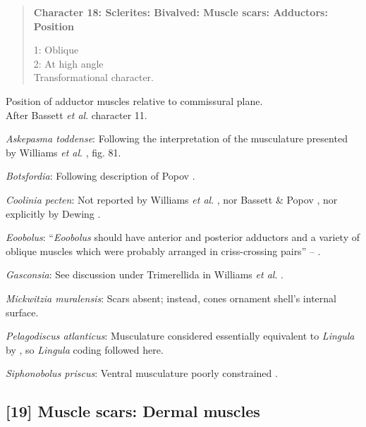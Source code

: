\documentclass[openany]{book}
\theoremstyle{definition}
\theoremstyle{definition}
\theoremstyle{definition}
\theoremstyle{remark}
\begin{document}
\begin{quote}
\textbf{Character 18: Sclerites: Bivalved: Muscle scars: Adductors:
Position}

1: Oblique\\
2: At high angle\\
Transformational character.
\end{quote}

Position of adductor muscles relative to commissural plane.\\
After Bassett \emph{et al}.
\citeyearpar{Bassett2001Functionalmorphology} character 11.

\hypertarget{Askepasma_toddense-coding-18}{}
\emph{Askepasma toddense}: Following the interpretation of the
musculature presented by Williams \emph{et al}.
\citeyearpar{Williams2000LinguliformeaCraniiformea}, fig. 81.

\hypertarget{Botsfordia-coding-18}{}
\emph{Botsfordia}: Following description of Popov
\citeyearpar{Popov1992TheCambrian}.

\hypertarget{Coolinia_pecten-coding-18}{}
\emph{Coolinia pecten}: Not reported by Williams \emph{et al}.
\citeyearpar{Williams2000LinguliformeaCraniiformea}, nor Bassett \&
Popov \citeyearpar{Bassett2017Earliestontogeny}, nor explicitly by
Dewing \citeyearpar{Dewing2001Hingemodifications}.

\hypertarget{Eoobolus-coding-18}{}
\emph{Eoobolus}: ``\emph{Eoobolus} should have anterior and posterior
adductors and a variety of oblique muscles which were probably arranged
in criss-crossing pairs'' -- \citet{Balthasar2009Thebrachiopod}.

\hypertarget{Gasconsia-coding-18}{}
\emph{Gasconsia}: See discussion under Trimerellida in Williams \emph{et
al}. \citeyearpar{Williams2000LinguliformeaCraniiformea}.

\hypertarget{Mickwitzia_muralensis-coding-18}{}
\emph{Mickwitzia muralensis}: Scars absent; instead, cones ornament
shell's internal surface.

\hypertarget{Pelagodiscus_atlanticus-coding-18}{}
\emph{Pelagodiscus atlanticus}: Musculature considered essentially
equivalent to \emph{Lingula} by
\citet{Williams2000LinguliformeaCraniiformea}, so \emph{Lingula} coding
followed here.

\hypertarget{Siphonobolus_priscus-coding-18}{}
\emph{Siphonobolus priscus}: Ventral musculature poorly constrained
\citep{Williams2000LinguliformeaCraniiformea, Popov2009Earlyontogeny}.

\subsection*{{[}19{]} Muscle scars: Dermal
muscles}\label{muscle-scars-dermal-muscles}
\end{document}

